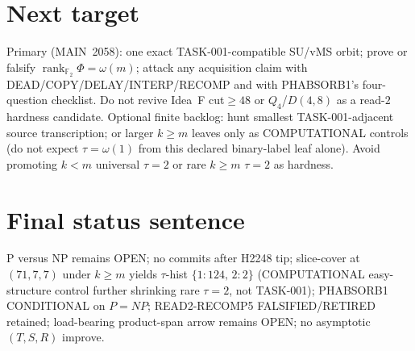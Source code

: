 \documentclass[11pt]{article}
\begin{document}
\section*{Next target}
Primary (MAIN~2058): one exact TASK-001-compatible SU/vMS orbit; prove or falsify
$\operatorname{rank}_{\mathbb F_2}\Phi=\omega(m)$; attack any acquisition claim with
DEAD/COPY/DELAY/INTERP/RECOMP and with PHABSORB1's four-question checklist.
Do not revive Idea~F cut$\ge48$ or $Q_4$/$D(4,8)$ as a read-$2$ hardness candidate.
Optional finite backlog: hunt smallest TASK-001-adjacent source transcription;
or larger $k{\ge}m$ leaves only as COMPUTATIONAL controls (do not expect $\tau=\omega(1)$
from this declared binary-label leaf alone).
Avoid promoting $k{<}m$ universal $\tau{=}2$ or rare $k{\ge}m$ $\tau{=}2$ as hardness.

\section*{Final status sentence}
P versus NP remains OPEN; no commits after H2248 tip; slice-cover at $(71,7,7)$
under $k{\ge}m$ yields $\tau$-hist $\{1{:}124,\,2{:}2\}$ (COMPUTATIONAL easy-structure
control further shrinking rare $\tau{=}2$, not TASK-001); PHABSORB1 CONDITIONAL on $P=NP$;
READ2-RECOMP5 FALSIFIED/RETIRED retained; load-bearing product-span arrow remains OPEN;
no asymptotic $(T,S,R)$ improve.
\end{document}

